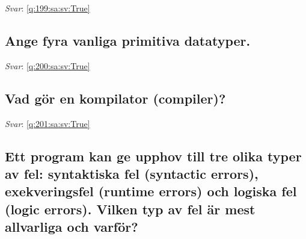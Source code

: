 \documentclass[a4paper,11pt,oneside]{article}
\begin{document}
\begin{sloppypar}
\label{q:199:sa:sv:False}

\vspace{2cm}

\noindent\makebox[\textwidth]{\hrulefill}

\vspace{1cm}

\textit{Svar}: \autoref{q:199:sa:sv:True}



\subsection{Ange fyra vanliga primitiva datatyper.}

\label{q:200:sa:sv:False}

\vspace{2cm}

\noindent\makebox[\textwidth]{\hrulefill}

\vspace{1cm}

\textit{Svar}: \autoref{q:200:sa:sv:True}



\subsection{Vad g\"or en kompilator (compiler)?}

\label{q:201:sa:sv:False}

\vspace{2cm}

\noindent\makebox[\textwidth]{\hrulefill}

\vspace{1cm}

\textit{Svar}: \autoref{q:201:sa:sv:True}



\subsection{Ett program kan ge upphov till tre olika typer av fel: syntaktiska fel (syntactic errors), exekveringsfel (runtime errors) och logiska fel (logic errors). Vilken typ av fel \"ar mest allvarliga och varf\"or?}

\label{q:202:sa:sv:False}

\vspace{2cm}

\noindent\makebox[\textwidth]{\hrulefill}

\vspace{1cm}


\end{sloppypar}
\end{document}
